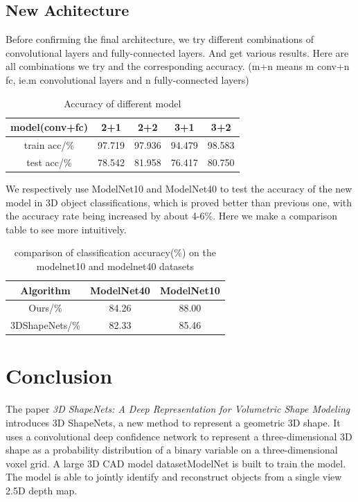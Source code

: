 \documentclass[11pt,journal,compsoc]{IEEEtran}
\begin{document}
  \subsection{New Achitecture}
  Before confirming the final architecture, we try different combinations of convolutional layers and fully-connected layers. And get various results. Here are all combinations we try and the corresponding accuracy.
  (m+n means m conv+n fc, ie.m convolutional layers and n fully-connected layers)

  \begin{table}[ht]
    \caption{Accuracy of different model} %
    \centering %
    \begin{tabular}{|c|c|c|c|c|}
    \hline 
    model(conv+fc)&2+1&2+2&3+1&3+2\\
    \hline  
    train acc/\%&97.719&97.936&94.479&98.583\\
    \hline 
    test acc/\%&78.542&81.958&76.417&80.750\\
    \hline 
    \end{tabular}
  \end{table}
  
  We respectively use ModelNet10 and ModelNet40 to test the accuracy of the new model in 3D object classifications, which is proved better than previous one, with the accuracy rate being increased by about 4-6\%.
  Here we make a comparison table to see more intuitively.

  \begin{table}[ht]
    \caption{comparison of classification accuracy(\%) on the modelnet10 and modelnet40 datasets} %
    \centering %
    \begin{tabular}{|c|c|c|}
    \hline 
    Algorithm&ModelNet40&ModelNet10\\
    \hline  
    Ours/\%&84.26&88.00\\
    \hline 
    3DShapeNets/\%&82.33&85.46\\
    \hline 
    \end{tabular}
  \end{table}

  \section{Conclusion}
  The paper \textit{3D ShapeNets: A Deep Representation for Volumetric Shape Modeling}  introduces 3D ShapeNets, a new method to represent a geometric 3D shape. 
  It uses a convolutional deep confidence network to represent a three-dimensional 3D shape as a probability distribution of a binary variable on a three-dimensional voxel grid. 
  A large 3D CAD model datasetModelNet is built to train the model. The model is able to jointly identify and reconstruct objects from a single view 2.5D depth map.
\end{document}

